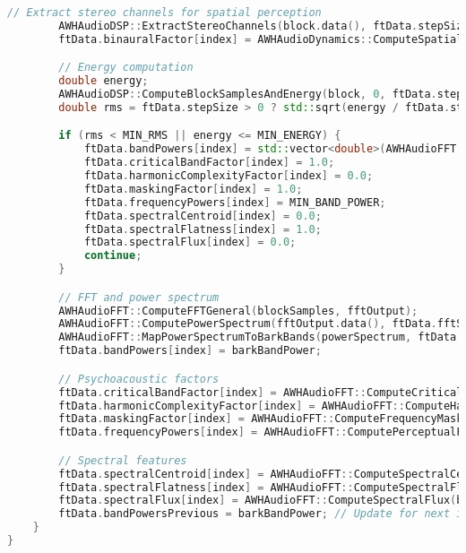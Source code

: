 \documentclass[11pt]{article}
\begin{document}
\begin{lstlisting}[language=C++]
		// Extract stereo channels for spatial perception
		AWHAudioDSP::ExtractStereoChannels(block.data(), ftData.stepSize, ftData.channels, leftChannel, rightChannel);
		ftData.binauralFactor[index] = AWHAudioDynamics::ComputeSpatialScore(leftChannel, rightChannel, ftData.stepSize, ftData.sampleRate);

		// Energy computation
		double energy;
		AWHAudioDSP::ComputeBlockSamplesAndEnergy(block, 0, ftData.stepSize, ftData.channels, blockSamples, energy, &ftData.hannWindow);
		double rms = ftData.stepSize > 0 ? std::sqrt(energy / ftData.stepSize) : 0.0;

		if (rms < MIN_RMS || energy <= MIN_ENERGY) {
			ftData.bandPowers[index] = std::vector<double>(AWHAudioFFT::BARK_BAND_NUMBER, MIN_BAND_POWER);
			ftData.criticalBandFactor[index] = 1.0;
			ftData.harmonicComplexityFactor[index] = 0.0;
			ftData.maskingFactor[index] = 1.0;
			ftData.frequencyPowers[index] = MIN_BAND_POWER;
			ftData.spectralCentroid[index] = 0.0;
			ftData.spectralFlatness[index] = 1.0;
			ftData.spectralFlux[index] = 0.0;
			continue;
		}

		// FFT and power spectrum
		AWHAudioFFT::ComputeFFTGeneral(blockSamples, fftOutput);
		AWHAudioFFT::ComputePowerSpectrum(fftOutput.data(), ftData.fftSize, ftData.stepSize, powerSpectrum);
		AWHAudioFFT::MapPowerSpectrumToBarkBands(powerSpectrum, ftData.fftSize, ftData.sampleRate, barkBandPower);
		ftData.bandPowers[index] = barkBandPower;

		// Psychoacoustic factors
		ftData.criticalBandFactor[index] = AWHAudioFFT::ComputeCriticalBandsFromPowerSpectrum(powerSpectrum, ftData.fftSize, ftData.sampleRate, barkBandPower);
		ftData.harmonicComplexityFactor[index] = AWHAudioFFT::ComputeHarmonicComplexity(barkBandPower);
		ftData.maskingFactor[index] = AWHAudioFFT::ComputeFrequencyMaskingFromPowerSpectrum(powerSpectrum, ftData.fftSize, ftData.sampleRate, barkBandPower);
		ftData.frequencyPowers[index] = AWHAudioFFT::ComputePerceptualFrequencyPower(barkBandPower, ftData.barkWeights);

		// Spectral features
		ftData.spectralCentroid[index] = AWHAudioFFT::ComputeSpectralCentroid(barkBandPower, ftData.sampleRate);
		ftData.spectralFlatness[index] = AWHAudioFFT::ComputeSpectralFlatness(barkBandPower, AWHAudioFFT::BARK_BAND_NUMBER);
		ftData.spectralFlux[index] = AWHAudioFFT::ComputeSpectralFlux(barkBandPower, ftData.bandPowersPrevious, AWHAudioFFT::BARK_BAND_NUMBER);
		ftData.bandPowersPrevious = barkBandPower; // Update for next iteration
	}
}
\end{lstlisting}
\end{document}
